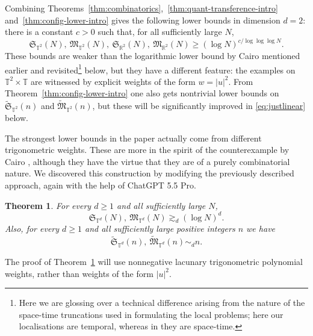 \documentclass[11pt,reqno]{amsart}
\newtheorem{theorem}{Theorem}[section]
\numberwithin{equation}{section}
\renewcommand{\ge}{\geqslant}
\begin{document}
Combining Theorems~\ref{thm:combinatorics},~\ref{thm:quant-transference-intro} and~\ref{thm:config-lower-intro} gives the following lower bounds in dimension $d=2$: there is a constant $c>0$ such that, for all sufficiently large $N$,
\begin{equation}\label{eq:logtologloglog}
\mathfrak{S}_{\mathbb{T}^2}(N),\ \mathfrak{M}_{\mathbb{T}^2}(N),\ \mathfrak{S}_{\mathbb{R}^2}(N),\ \mathfrak{M}_{\mathbb{R}^2}(N) \ge (\log N)^{c/\log\log\log N}.
\end{equation}
These bounds are weaker than the logarithmic lower bound by Cairo mentioned earlier and revisited\footnote{Here we are glossing over a technical difference arising from the nature of the space-time truncations used in formulating the local problems; here our localisations are temporal, whereas in \cite{Cairo} they are space-time.} below, but they have a different feature: the examples on $\mathbb{T}^2\times\mathbb{T}$ are witnessed by explicit weights of the form $w=|u|^2$.
From Theorem~\ref{thm:config-lower-intro} one also gets nontrivial lower bounds on $\widetilde{\mathfrak{S}}_{\mathbb{T}^2}(n)$ and $\widetilde{\mathfrak{M}}_{\mathbb{T}^2}(n)$, but these will be significantly improved in \eqref{eq:justlinear} below.

The strongest lower bounds in the paper actually come from different trigonometric weights.
These are more in the spirit of the counterexample by Cairo \cite{Cairo}, although they have the virtue that they are of a purely combinatorial nature.
We discovered this construction by modifying the previously described approach, again with the help of ChatGPT 5.5 Pro.

\begin{theorem}\label{thm:d1-log-intro}
For every $d\ge1$ and all sufficiently large $N$,
\begin{equation}\label{eq:justlog1}
\mathfrak{S}_{\mathbb{T}^d}(N),\ \mathfrak{M}_{\mathbb{T}^d}(N)\gtrsim_d (\log N)^d.
\end{equation}
Also, for every $d\ge1$ and all sufficiently large positive integers $n$ we have
\begin{equation}\label{eq:justlinear}
\widetilde{\mathfrak{S}}_{\mathbb{T}^d}(n),\ \widetilde{\mathfrak{M}}_{\mathbb{T}^d}(n)\sim_d n.
\end{equation}
\end{theorem}

The proof of Theorem~\ref{thm:d1-log-intro} will use nonnegative lacunary trigonometric polynomial weights, rather than weights of the form $|u|^2$. 
\end{document}
